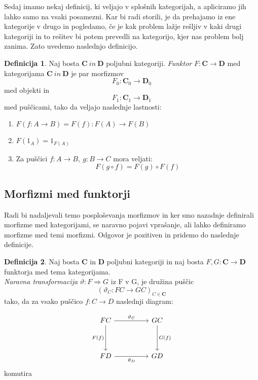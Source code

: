 \documentclass[12pt,a4paper]{book}
\theoremstyle{definition}
\newtheorem{definicija}{Definicija}[chapter]
\theoremstyle{plain}
\theoremstyle{definition}
\theoremstyle{remark}
\newcommand{\cat}[1]{\textbf{#1}}
\begin{document}
Sedaj imamo nekaj definicij, ki veljajo v splošnih kategorijah, a apliciramo jih lahko samo na vsaki posamezni. Kar bi radi storili, je da prehajamo iz ene kategorije v drugo in pogledamo, če je kak problem lažje rešljiv v kaki drugi kategoriji in to rešitev bi potem prevedli na kategorijo, kjer nas problem bolj zanima.
Zato uvedemo naslednjo definicijo.
\begin{definicija}
Naj bosta $\cat{C} \ in \ \cat{D}$ poljubni kategoriji. \textit{Funktor} $F : \cat{C} \to \cat{D}$ med kategorijama $\cat{C} \ in \ \cat{D}$ je par morfizmov
$$F_0 : \cat{C}_0 \to \cat{D}_0$$
med objekti in
$$F_1 : \cat{C}_1 \to \cat{D}_1$$
med puščicami, tako da veljajo naslednje lastnosti:
\begin{enumerate}
\item $F(f : A \to B) = F(f) : F(A) \to F(B)$
\item $F(1_A) = 1_{F(A)}$
\item Za puščici $f : A \to B, \ g : B \to C$ mora veljati:
$$F(g \circ f) = F(g) \circ F(f)$$
\end{enumerate}
\end{definicija}

\subsection{Morfizmi med funktorji}
Radi bi nadaljevali temo posploševanja morfizmov in ker smo nazadnje definirali morfizme med kategorijami, se naravno pojavi vprašanje, ali lahko definiramo morfizme med temi morfizmi. Odgovor je pozitiven in pridemo do naslednje definicije.

\begin{definicija}
Naj bosta $\cat{C}$ in $\cat{D}$ poljubni kategoriji in naj bosta $F,G : \cat{C} \to \cat{D}$ funktorja med tema kategorijama. \\
\textit{Naravna transformacija} $\vartheta : F \Rightarrow G$ iz F v G, je družina puščic 
$$(\vartheta_C : FC \to GC)_{C \in \cat{C}}$$
tako, da za vsako puščico $f : C \to D$ naslednji diagram:

\begin{equation}
\begin{tikzcd}[sep=huge]
FC \arrow[r, "\vartheta_C"] \arrow[d, "F(f)"'] & GC \arrow[d, "G(f)"] \\
FD \arrow[r, "\vartheta_D"'] & GD
\end{tikzcd}
\end{equation}
komutira
\end{definicija}
\end{document}
